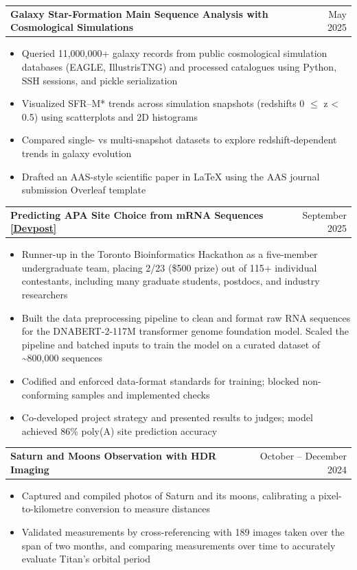 \documentclass[letterpaper,10pt]{article}
\makeatletter
\newcommand{\heading}[2]{\begin{tabular*}{\textwidth}{l@{\extracolsep{\fill}}r}\textbf{#1} & #2\end{tabular*}}
\makeatother
\begin{document}
\vspace{3pt}\heading{Galaxy Star-Formation Main Sequence Analysis with Cosmological Simulations}{May 2025}
\begin{itemize}\small
\item Queried 11,000,000+ galaxy records from public cosmological simulation databases (EAGLE, IllustrisTNG) and processed catalogues using Python, SSH sessions, and pickle serialization
\item Visualized SFR--M* trends across simulation snapshots (redshifts 0 $\leq$ z < 0.5) using scatterplots and 2D histograms
\item Compared single- vs multi-snapshot datasets to explore redshift-dependent trends in galaxy evolution
\item Drafted an AAS-style scientific paper in LaTeX using the AAS journal submission Overleaf template
\end{itemize}
\vspace{3pt}\heading{Predicting APA Site Choice from mRNA Sequences \href{https://devpost.com/software/predicting-apa-site-choice-from-mrna-sequences}{\textnormal{\underline{[Devpost]}}}}{September 2025}
\begin{itemize}\small
\item Runner-up in the Toronto Bioinformatics Hackathon as a five-member undergraduate team, placing 2/23 (\$500 prize) out of 115+ individual contestants, including many graduate students, postdocs, and industry researchers
\item Built the data preprocessing pipeline to clean and format raw RNA sequences for the DNABERT-2-117M transformer genome foundation model. Scaled the pipeline and batched inputs to train the model on a curated dataset of \textasciitilde{}800,000 sequences
\item Codified and enforced data-format standards for training; blocked non-conforming samples and implemented checks
\item Co-developed project strategy and presented results to judges; model achieved 86\% poly(A) site prediction accuracy
\end{itemize}
\vspace{3pt}\heading{Saturn and Moons Observation with HDR Imaging}{October -- December 2024}
\begin{itemize}\small
\item Captured and compiled photos of Saturn and its moons, calibrating a pixel-to-kilometre conversion to measure distances
\item Validated measurements by cross-referencing with 189 images taken over the span of two months, and comparing measurements over time to accurately evaluate Titan's orbital period
\end{itemize}
\end{document}
